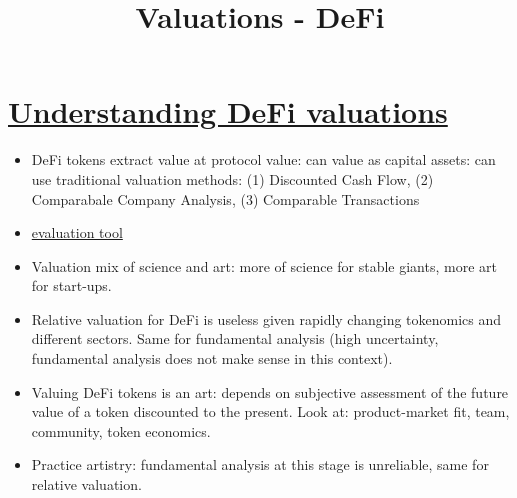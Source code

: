 \documentclass{../../notes}
\title{Valuations - DeFi}
\begin{document}
\maketitle

\section{\href{run:./understanding-defi-valuations.pdf}{Understanding DeFi valuations}}
\begin{itemize}
    \item DeFi tokens extract value at protocol value: can value as capital assets: can use traditional valuation methods: (1) Discounted Cash Flow, (2) Comparabale Company Analysis, (3) Comparable Transactions
    \item \href{https://www.tokenterminal.com/}{evaluation tool}
    \item Valuation mix of science and art: more of science for stable giants, more art for start-ups. 
    \item Relative valuation for DeFi is useless given rapidly changing tokenomics and different sectors. Same for fundamental analysis (high uncertainty, fundamental analysis does not make sense in this context). 
    \item Valuing DeFi tokens is an art: depends on subjective assessment of the future value of a token discounted to the present. Look at: product-market fit, team, community, token economics. 
    \item Practice artistry: fundamental analysis at this stage is unreliable, same for relative valuation. 
\end{itemize}
\end{document}

